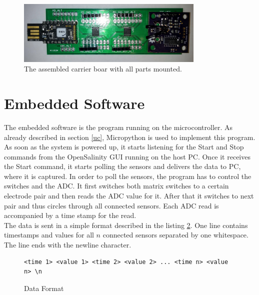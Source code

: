 \begin{figure}
	\begin{center}
		\includegraphics[width=0.8\textwidth]{images/cb.jpg} 
		\caption{The assembled carrier boar with all parts mounted.}
		\label{fig:cb}
	\end{center}
\end{figure}

\section{Embedded Software}

The embedded software is the program running on the microcontroller. As already described in section \ref{uc}, Micropython is used to implement this program.\\

As soon as the system is powered up, it starts listening for the Start and Stop commands from the OpenSalinity GUI running on the host PC. Once it receives the Start command, it starts polling the sensors and delivers the data to PC, where it is captured.
In order to poll the sensors, the program has to control the switches and the ADC. It first switches both matrix switches to a certain electrode pair and then reads the ADC value for it. After that it switches to next pair and thus circles through all connected sensors. Each ADC read is accompanied by a time stamp for the read.\\

The data is sent in a simple format described in the listing \ref{format}. One line contains timestamps and values for all $n$ connected sensors separated by one whitespace. The line ends with the newline character.

\begin{figure}[H]
\begin{center}
\begin{lstlisting}
<time 1> <value 1> <time 2> <value 2> ... <time n> <value n> \n
\end{lstlisting}
\caption{Data Format}
\label{format}
\end{center}
\end{figure}

